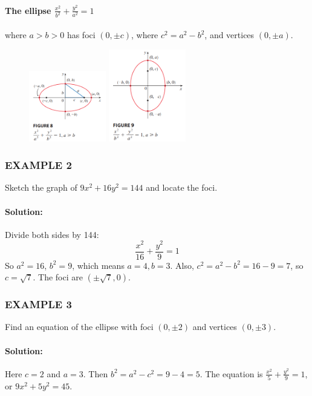 \documentclass{article}
\begin{document}
\paragraph{The ellipse $\frac{x^2}{b^2} + \frac{y^2}{a^2} = 1$} where $a > b > 0$ has foci $(0, \pm c)$, where $c^2 = a^2 - b^2$, and vertices $(0, \pm a)$.
\begin{figure}[htbp]
    \centering
    \includegraphics[width=0.3\textwidth]{graph 55.png}
    \includegraphics[width=0.3\textwidth]{graph54.png}
\end{figure}
\subsubsection*{EXAMPLE 2}
Sketch the graph of $9x^2 + 16y^2 = 144$ and locate the foci.

\paragraph{Solution:} Divide both sides by 144:
\[
\frac{x^2}{16} + \frac{y^2}{9} = 1
\]
So $a^2 = 16$, $b^2 = 9$, which means $a=4, b=3$. Also, $c^2 = a^2 - b^2 = 16 - 9 = 7$, so $c = \sqrt{7}$. The foci are $(\pm\sqrt{7}, 0)$.

\subsubsection*{EXAMPLE 3}
Find an equation of the ellipse with foci $(0, \pm2)$ and vertices $(0, \pm3)$.

\paragraph{Solution:}
Here $c=2$ and $a=3$. Then $b^2 = a^2 - c^2 = 9 - 4 = 5$. The equation is $\frac{x^2}{5} + \frac{y^2}{9} = 1$, or $9x^2 + 5y^2 = 45$.
\end{document}
